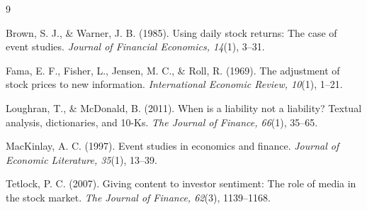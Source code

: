 \documentclass[11pt]{article}
\begin{document}
\begin{thebibliography}{9}

Brown, S. J., \& Warner, J. B. (1985).
Using daily stock returns: The case of event studies.
\textit{Journal of Financial Economics, 14}(1), 3--31.

Fama, E. F., Fisher, L., Jensen, M. C., \& Roll, R. (1969).
The adjustment of stock prices to new information.
\textit{International Economic Review, 10}(1), 1--21.

Loughran, T., \& McDonald, B. (2011).
When is a liability not a liability? Textual analysis, dictionaries, and 10-Ks.
\textit{The Journal of Finance, 66}(1), 35--65.

MacKinlay, A. C. (1997).
Event studies in economics and finance.
\textit{Journal of Economic Literature, 35}(1), 13--39.

Tetlock, P. C. (2007).
Giving content to investor sentiment: The role of media in the stock market.
\textit{The Journal of Finance, 62}(3), 1139--1168.

\end{thebibliography}
\end{document}
